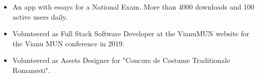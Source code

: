 \begin{itemize}
    \item An app with essays for a National Exam. More than 4000 downloads and 100 active users daily.
\end{itemize}
\begin{itemize}
    \item Volunteered as Full Stack Software Developer at the VianuMUN website for the Vianu MUN conference in 2019.
    \item Volunteered as Assets Designer for "Concurs de Costume Traditionale Romanesti".
\end{itemize}